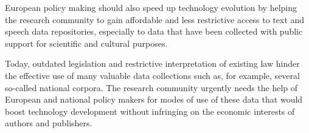 \documentclass[10pt, plain]{../../metanetpaper}
\begin{document}
\begin{multicols}{2}
European policy making should also speed up technology evolution by helping the research community to gain affordable and less restrictive access to text and speech data repositories, especially to data that have been collected with public support for scientific and cultural purposes. 

Today, outdated legislation and restrictive interpretation of existing law hinder the effective use of many valuable data collections such as, for example, several so-called national corpora. The research community urgently needs the help of European and national policy makers for modes of use of these data that would boost technology development without infringing on the economic interests of authors and publishers.
\end{multicols}


\clearpage

\label{sec:conclusions}
\end{document}
